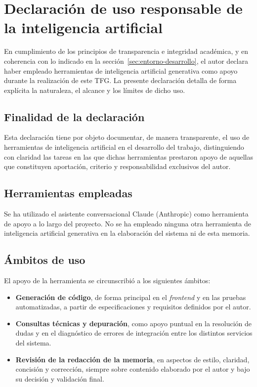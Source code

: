 \chapter{Declaración de uso responsable de la inteligencia artificial}
\label{anx:ia}

En cumplimiento de los principios de transparencia e integridad académica, y en
coherencia con lo indicado en la sección~\ref{sec:entorno-desarrollo}, el autor
declara haber empleado herramientas de inteligencia artificial generativa como
apoyo durante la realización de este \ac{TFG}.  La presente declaración detalla
de forma explícita la naturaleza, el alcance y los límites de dicho uso.

\section*{Finalidad de la declaración}

Esta declaración tiene por objeto documentar, de manera transparente, el uso de
herramientas de inteligencia artificial en el desarrollo del trabajo,
distinguiendo con claridad las tareas en las que dichas herramientas prestaron
apoyo de aquellas que constituyen aportación, criterio y responsabilidad
exclusivos del autor.

\section*{Herramientas empleadas}

Se ha utilizado el asistente conversacional Claude (Anthropic) como herramienta
de apoyo a lo largo del proyecto.  No se ha empleado ninguna otra herramienta de
inteligencia artificial generativa en la elaboración del sistema ni de esta
memoria.

\section*{Ámbitos de uso}

El apoyo de la herramienta se circunscribió a los siguientes ámbitos:

\begin{itemize}
  \item \textbf{Generación de código}, de forma principal en el \emph{frontend}
    y en las pruebas automatizadas, a partir de especificaciones y requisitos
    definidos por el autor.

  \item \textbf{Consultas técnicas y depuración}, como apoyo puntual en la
    resolución de dudas y en el diagnóstico de errores de integración entre los
    distintos servicios del sistema.

  \item \textbf{Revisión de la redacción de la memoria}, en aspectos de estilo,
    claridad, concisión y corrección, siempre sobre contenido elaborado por el
    autor y bajo su decisión y validación final.
\end{itemize}

